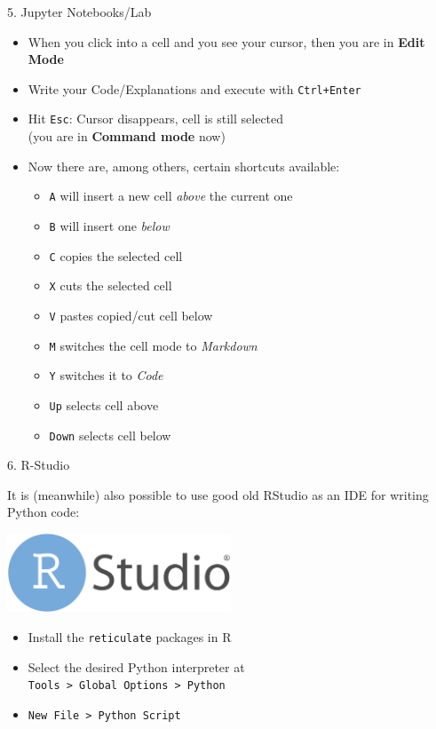 \begin{vbframe}{5. Jupyter Notebooks/Lab}

\vfill

\begin{itemize}
	\item When you click into a cell and you see your cursor, then you are in \textbf{Edit Mode}
	\item Write your Code/Explanations and execute with \texttt{Ctrl+Enter}
	\item Hit \texttt{Esc}: Cursor disappears, cell is still selected\\
  (you are in \textbf{Command mode} now)
	\item Now there are, among others, certain shortcuts available:
	\begin{itemize}
		\item \texttt{A} will insert a new cell \textit{above} the current one
    \item \texttt{B} will insert one \textit{below}
    \item \texttt{C} copies the selected cell
    \item \texttt{X} cuts the selected cell
    \item \texttt{V} pastes copied/cut cell below
    \item \texttt{M} switches the cell mode to \textit{Markdown}
    \item \texttt{Y} switches it to \textit{Code}
    \item \texttt{Up} selects cell above
    \item \texttt{Down} selects cell below
	\end{itemize}
\end{itemize}

\vfill

\end{vbframe}


\begin{vbframe}{6. R-Studio}

\vfill

It is (meanwhile) also possible to use good old RStudio as an IDE for writing Python code:  

\centering
\includegraphics[width=0.5\textwidth]{figure/rstudio.png}

\begin{itemize}
	\item Install the \texttt{reticulate} packages in R
	\item Select the desired Python interpreter at\\
  \texttt{Tools > Global Options > Python}
	\item \texttt{New File > Python Script}
\end{itemize}

\vfill

\end{vbframe}

